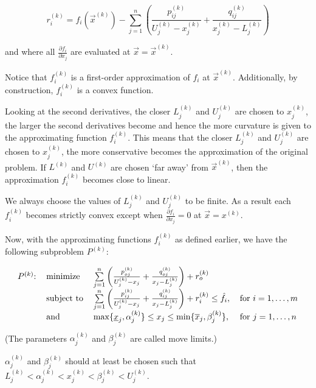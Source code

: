 $$r_i^{(k)}=f_i(\vec{x}^{(k)})-\sum\limits_{j=1}^{n}\left(\frac{p_{ij}^{(k)}}{U_j^{(k)}-x_j^{(k)}}+\frac{q_{ij}^{(k)}}{x_j^{(k)}-L_j^{(k)}}\right)$$
	
and where all $\frac{\partial f_i}{\partial x_j}$ are evaluated at $\vec{x}=\vec{x}^{(k)}$.

Notice that $f_i^{(k)}$ is a first-order approximation of $f_i$ at $\vec{x}^{(k)}$. Additionally, by construction, $f_i^{(k)}$ is a convex function.

Looking at the second derivatives, the closer $L_j^{(k)}$ and $U_j^{(k)}$ are chosen to $x_j^{(k)}$, the larger the second derivatives become and hence the more curvature is given to the approximating function $f_i^{(k)}$. This means that the closer $L_j^{(k)}$ and $U_j^{(k)}$ are chosen to $x_j^{(k)}$, the more conservative becomes the approximation of the original problem. If $L^{(k)}$ and $U^{(k)}$ are chosen `far away' from $\vec{x}^{(k)}$, then the approximation $f_i^{(k)}$ becomes close to linear.

We always choose the values of $L_j^{(k)}$ and $U_j^{(k)}$ to be finite. As a result each $f_i^{(k)}$ becomes strictly convex except when $\frac{\partial f_i}{\partial x_j}=0$ at $\vec{x}=x^{(k)}$.

Now, with the approximating functions $f_i^{(k)}$ as defined earlier, we have the following subproblem $P^{(k)}$:

\begin{equation}
	\begin{tabular}{llll}
		$P^{(k)}$: & minimize   & $\sum\limits_{j=1}^{n}\left(\frac{p_{oj}^{(k)}}{U_j^{(k)}-x_j}+\frac{q_{oj}^{(k)}}{x_j-L_j^{(k)}}\right)+r_o^{(k)}$               &                    \\
		           & subject to & $\sum\limits_{j=1}^{n}\left(\frac{p_{ij}^{(k)}}{U_j^{(k)}-x_j}+\frac{q_{ij}^{(k)}}{x_j-L_j^{(k)}}\right)+r_i^{(k)}\leq\hat{f}_i$, & for $i=1,\ldots,m$ \\
		           & and        & $\max\lbrace\underline{x}_j,\alpha_j^{(k)}\rbrace\leq x_j\leq \min\lbrace \overline{x}_j,\beta_j^{(k)}\rbrace$,                   & for $j=1,\ldots,n$ 
	\end{tabular}
\end{equation}

(The parameters $\alpha_j^{(k)}$ and $\beta_j^{(k)}$ are called move limits.)

$\alpha_j^{(k)}$ and $\beta_j^{(k)}$ should at least be chosen such that $L_j^{(k)}<\alpha_j^{(k)}<x_j^{(k)}<\beta_j^{(k)}<U_j^{(k)}$.

